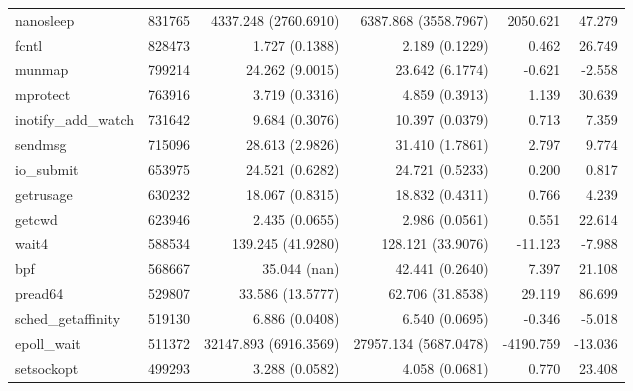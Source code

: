 \begin{longtable}{>{\ttfamily}lrrrrr}
                      nanosleep &     831765 &     4337.248 (2760.6910) &     6387.868 (3558.7967) &        2050.621 &       47.279 \\
                          fcntl &     828473 &           1.727 (0.1388) &           2.189 (0.1229) &           0.462 &       26.749 \\
                         munmap &     799214 &          24.262 (9.0015) &          23.642 (6.1774) &          -0.621 &       -2.558 \\
                       mprotect &     763916 &           3.719 (0.3316) &           4.859 (0.3913) &           1.139 &       30.639 \\
            inotify\_add\_watch &     731642 &           9.684 (0.3076) &          10.397 (0.0379) &           0.713 &        7.359 \\
                        sendmsg &     715096 &          28.613 (2.9826) &          31.410 (1.7861) &           2.797 &        9.774 \\
                     io\_submit &     653975 &          24.521 (0.6282) &          24.721 (0.5233) &           0.200 &        0.817 \\
                      getrusage &     630232 &          18.067 (0.8315) &          18.832 (0.4311) &           0.766 &        4.239 \\
                         getcwd &     623946 &           2.435 (0.0655) &           2.986 (0.0561) &           0.551 &       22.614 \\
                          wait4 &     588534 &        139.245 (41.9280) &        128.121 (33.9076) &         -11.123 &       -7.988 \\
                            bpf &     568667 &             35.044 (nan) &          42.441 (0.2640) &           7.397 &       21.108 \\
                        pread64 &     529807 &         33.586 (13.5777) &         62.706 (31.8538) &          29.119 &       86.699 \\
             sched\_getaffinity &     519130 &           6.886 (0.0408) &           6.540 (0.0695) &          -0.346 &       -5.018 \\
                    epoll\_wait &     511372 &    32147.893 (6916.3569) &    27957.134 (5687.0478) &       -4190.759 &      -13.036 \\
                     setsockopt &     499293 &           3.288 (0.0582) &           4.058 (0.0681) &           0.770 &       23.408 \\

\end{longtable}
